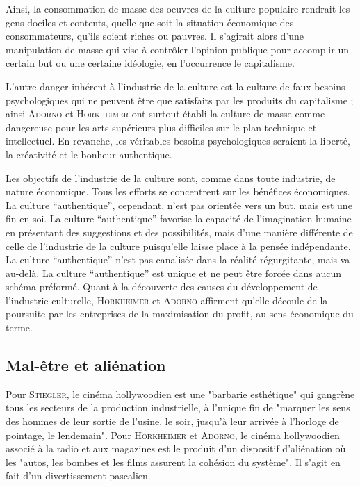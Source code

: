 \documentclass[a4paper,14pt]{extreport}
\begin{document}
Ainsi, la consommation de masse des oeuvres de la culture populaire rendrait les gens dociles et contents, quelle que soit la situation économique des consommateurs, qu’ils soient riches ou pauvres. Il s’agirait alors d’une manipulation de masse qui vise à contrôler l’opinion publique pour accomplir un certain but ou une certaine idéologie, en l'occurrence le capitalisme.

L’autre danger inhérent à l'industrie de la culture est la culture de faux besoins psychologiques qui ne peuvent être que satisfaits par les produits du capitalisme ; ainsi \textsc{Adorno} et \textsc{Horkheimer} ont surtout établi la culture de masse comme dangereuse pour les arts supérieurs plus difficiles sur le plan technique et intellectuel. En revanche, les véritables besoins psychologiques seraient la liberté, la créativité et le bonheur authentique.

Les objectifs de l'industrie de la culture sont, comme dans toute industrie, de nature économique. Tous les efforts se concentrent sur les bénéfices économiques. La culture “authentique”, cependant, n'est pas orientée vers un but, mais est une fin en soi. La culture “authentique” favorise la capacité de l'imagination humaine en présentant des suggestions et des possibilités, mais d'une manière différente de celle de l'industrie de la culture puisqu'elle laisse place à la pensée indépendante. La culture “authentique” n'est pas canalisée dans la réalité régurgitante, mais va au-delà. La culture “authentique” est unique et ne peut être forcée dans aucun schéma préformé. Quant à la découverte des causes du développement de l'industrie culturelle, \textsc{Horkheimer} et \textsc{Adorno} affirment qu'elle découle de la poursuite par les entreprises de la maximisation du profit, au sens économique du terme.

\subsection{Mal-être et aliénation}

Pour \textsc{Stiegler}, le cinéma hollywoodien est une "barbarie esthétique"  qui gangrène tous les secteurs de la production industrielle, à l'unique fin de "marquer les sens des hommes de leur sortie de l'usine, le soir, jusqu'à leur arrivée à l'horloge de pointage, le lendemain". Pour \textsc{Horkheimer} et \textsc{Adorno}, le cinéma hollywoodien associé à la radio et aux magazines est le produit d'un dispositif d’aliénation où les "autos, les bombes et les films assurent la cohésion du système". Il s'agit en fait d'un divertissement pascalien.
\end{document}
